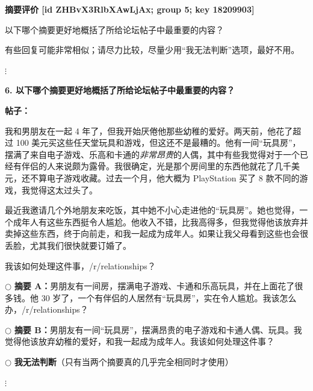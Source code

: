 \begin{minipage}{.98\linewidth}
\small
\textbf{摘要评价 [id ZHBvX3RlbXAwLjAx; group 5; key 18209903]}\par
以下哪个摘要更好地概括了所给论坛帖子中最重要的内容？\par
有些回复可能非常相似；请尽力比较，尽量少用“我无法判断”选项，最好不用。\par
\centering $\vdots$\par\raggedright
\textbf{6. 以下哪个摘要更好地概括了所给论坛帖子中最重要的内容？}\par
\textbf{帖子：}\par
我和男朋友在一起 4 年了，但我开始厌倦他那些幼稚的爱好。两天前，他花了超过 100 美元买这些任天堂玩具和游戏，但这还不是最糟的。他有一间“玩具房”，摆满了来自电子游戏、乐高和卡通的\emph{非常昂贵}的人偶，其中有些我觉得对于一个已经有伴侣的人来说颇为露骨。我很确定，光是那个房间里的东西他就花了几千美元，还不算电子游戏收藏。过去一个月，他大概为 PlayStation 买了 8 款不同的游戏，我觉得这太过头了。\par
最近我邀请几个外地朋友来吃饭，其中她不小心走进他的“玩具房”。她也觉得，一个成年人有这些东西挺令人尴尬。他收入不错，比我高得多，但我觉得他该放弃并卖掉这些东西，终于向前走，和我一起成为成年人。如果让我父母看到这些也会很丢脸，尤其我们很快就要订婚了。\par
我该如何处理这件事，/r/relationships？\par
$\bigcirc$ \textbf{摘要 A：}男朋友有一间房，摆满电子游戏、卡通和乐高玩具，并在上面花了很多钱。他 30 岁了，一个有伴侣的人居然有“玩具房”，实在令人尴尬。我该怎么办，/r/relationships？\par
$\bigcirc$ \textbf{摘要 B：}男朋友有一间“玩具房”，摆满昂贵的电子游戏和卡通人偶、玩具。我觉得他该放弃幼稚的爱好，和我一起成为成年人。我该如何处理这件事？\par
$\bigcirc$ \textbf{我无法判断}（只有当两个摘要真的几乎完全相同时才使用）\par
\centering $\vdots$
\end{minipage}
